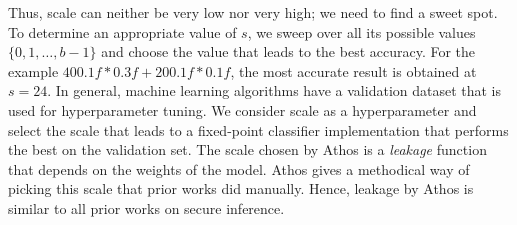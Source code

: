 Thus, scale can neither be very low nor very high; we need to find a sweet spot.
To determine an appropriate value of $s$, we sweep over all its possible values $\{0,1,\ldots,b-1\}$
and choose the value that leads to the best accuracy. For the example $400.1f*0.3f+200.1f*0.1f$,
the most accurate result is obtained at $s=24$. In general, machine learning algorithms have a 
 validation dataset that is used for hyperparameter tuning. We consider scale as a hyperparameter
and select the scale that leads to a fixed-point classifier implementation that performs the best on the validation set.
The scale chosen by Athos is a {\em leakage} function that depends on the weights of the model.
Athos gives a methodical way of picking this scale that prior works did manually.
Hence, leakage by Athos is similar to all prior works on secure inference. 





\begin{table}
  \centering
 \caption{Floating-point vs Fixed-point multiplication.}
\label{tab:floatvsfixed}
\end{table}

